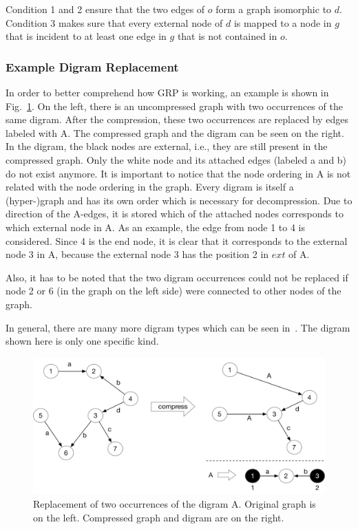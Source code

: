 Condition 1 and 2 ensure that the two edges of $o$ form a graph isomorphic to $d$. Condition 3 makes sure that every external node of $d$ is mapped to a node in $g$ that is incident to at least one edge in $g$ that is not contained in $o$.~\cite{maneth}

\subsubsection{Example Digram Replacement}\label{sec:relatedworkExDigramReplacement}

In order to better comprehend how GRP is working, an example is shown in Fig.~\ref{fig:examplereplacement}. On the left, there is an uncompressed graph with two occurrences of the same digram. After the compression, these two occurrences are replaced by edges labeled with A. The compressed graph and the digram can be seen on the right. In the digram, the black nodes are external, i.e., they are still present in the compressed graph. Only the white node and its attached edges (labeled a and b) do not exist anymore. It is important to notice that the node ordering in A is not related with the node ordering in the graph. Every digram is itself a (hyper-)graph and has its own order which is necessary for decompression. Due to direction of the A-edges, it is stored which of the attached nodes corresponds to which external node in A. As an example, the edge from node 1 to 4 is considered. Since 4 is the end node, it is clear that it corresponds to the external node 3 in A, because the external node 3 has the position 2 in $ext$ of A.

Also, it has to be noted that the two digram occurrences could not be replaced if node 2 or 6 (in the graph on the left side) were connected to other nodes of the graph.

In general, there are many more digram types which can be seen in~\cite{maneth}. The digram shown here is only one specific kind.

\begin{figure}
	\centering
	\includegraphics[width=\linewidth]{figures/relatedwork/exampleReplacement}
	\caption{Replacement of two occurrences of the digram A. Original graph is on the left. Compressed graph and digram are on the right.}
	\label{fig:examplereplacement}
\end{figure}

